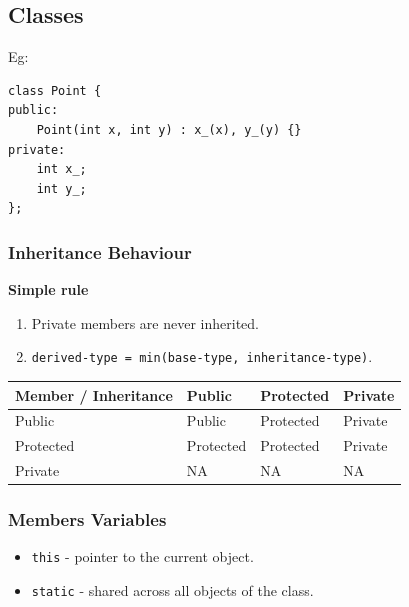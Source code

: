\subsection{Classes}

Eg:
\begin{mdframed}[nobreak=true,backgroundcolor=gray!10,linecolor=Firebrick4]
\begin{verbatim}
class Point {
public:
    Point(int x, int y) : x_(x), y_(y) {}
private:
    int x_;
    int y_;
};
\end{verbatim}
\end{mdframed}

\subsubsection{Inheritance Behaviour}

\begin{mdframed}[nobreak=true,backgroundcolor=SlateGray2!40,linecolor=Firebrick4]
\textbf{Simple rule}
\begin{enumerate}
\item Private members are never inherited.
\item \texttt{derived-type = min(base-type, inheritance-type)}.
\end{enumerate}
\end{mdframed}

\begin{tabular}{|l|l|l|l|}
\hline
Member / Inheritance & Public    & Protected & Private \\ \hline
Public               & Public    & Protected & Private \\ \hline
Protected            & Protected & Protected & Private \\ \hline
Private              & NA        & NA        & NA      \\ \hline 
\end{tabular}

\subsubsection{Members Variables}

\begin{itemize}
\item \texttt{this} - pointer to the current object.
\item \texttt{static} - shared across all objects of the class.
\end{itemize}




